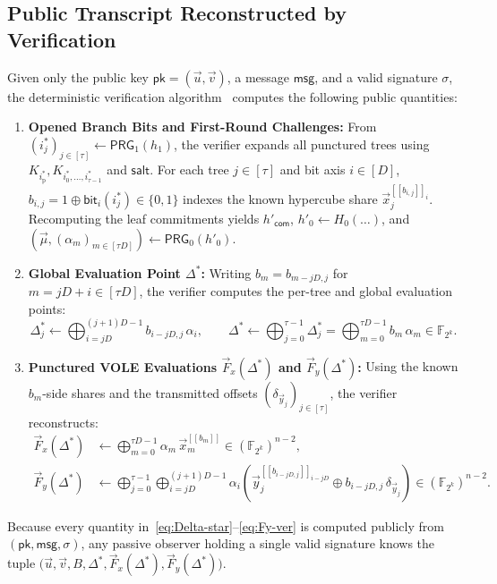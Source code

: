 \documentclass[11pt,a4paper]{article}
\theoremstyle{definition}
\theoremstyle{remark}
\newcommand{\Ftwok}{\mathbb{F}_{2^k}}
\newcommand{\pk}{\mathsf{pk}}
\newcommand{\salt}{\mathsf{salt}}
\newcommand{\msg}{\mathsf{msg}}
\newcommand{\com}{\mathsf{com}}
\newcommand{\PRG}{\mathsf{PRG}}
\newcommand{\share}[1]{[\![#1]\!]}
\begin{document}
\subsection{Public Transcript Reconstructed by Verification}
\label{subsec:verifier-reconstructs}
Given only the public key $\pk = (\vec{u}, \vec{v})$, a message $\msg$, and a valid signature $\sigma$, the deterministic verification algorithm~\cite[Section~5]{HJ25} computes the following public quantities:
\begin{enumerate}[leftmargin=2em]
    \item \textbf{Opened Branch Bits and First-Round Challenges:} From $(i^*_j)_{j \in [\tau]} \leftarrow \PRG_1(h_1)$, the verifier expands all punctured trees using $K_{i^*_{\text{p}}}, K_{i^*_0, \dots, i^*_{\tau-1}}$ and $\salt$. For each tree $j \in [\tau]$ and bit axis $i \in [D]$, $b_{i,j} = 1 \oplus \mathsf{bit}_i(i^*_j) \in \{0, 1\}$ indexes the known hypercube share $\vec{x}_j^{\share{b_{i,j}}_i}$. Recomputing the leaf commitments yields $h'_{\com}$, $h'_0 \leftarrow H_0(\dots)$, and $(\vec{\mu}, (\alpha_m)_{m \in [\tau D]}) \leftarrow \PRG_0(h'_0)$.
    \item \textbf{Global Evaluation Point $\Delta^*$:} Writing $b_m = b_{m - jD, j}$ for $m = jD + i \in [\tau D]$, the verifier computes the per-tree and global evaluation points:
    \begin{equation}
    \label{eq:Delta-star}
    \Delta^*_j \leftarrow \bigoplus_{i=jD}^{(j+1)D-1} b_{i-jD, j} \, \alpha_i, \qquad
    \Delta^* \leftarrow \bigoplus_{j=0}^{\tau-1} \Delta^*_j = \bigoplus_{m=0}^{\tau D-1} b_m \, \alpha_m \in \Ftwok.
    \end{equation}
    \item \textbf{Punctured VOLE Evaluations $\vec{F}_x(\Delta^*)$ and $\vec{F}_y(\Delta^*)$:} Using the known $b_m$-side shares and the transmitted offsets $(\delta_{\vec{y}_j})_{j \in [\tau]}$, the verifier reconstructs:
    \begin{align}
    \vec{F}_x(\Delta^*) &\leftarrow \bigoplus_{m=0}^{\tau D-1} \alpha_m \, \vec{x}_m^{\share{b_m}} \in (\Ftwok)^{n-2}, \label{eq:Fx-ver} \\
    \vec{F}_y(\Delta^*) &\leftarrow \bigoplus_{j=0}^{\tau-1} \bigoplus_{i=jD}^{(j+1)D-1} \alpha_i \left(\vec{y}_j^{\share{b_{i-jD,j}}_{i-jD}} \oplus b_{i-jD,j} \, \delta_{\vec{y}_j}\right) \in (\Ftwok)^{n-2}. \label{eq:Fy-ver}
    \end{align}
\end{enumerate}

Because every quantity in~\eqref{eq:Delta-star}--\eqref{eq:Fy-ver} is computed publicly from $(\pk, \msg, \sigma)$, any passive observer holding a single valid signature knows the tuple $\big(\vec{u}, \vec{v}, B, \Delta^*, \vec{F}_x(\Delta^*), \vec{F}_y(\Delta^*)\big)$.
\end{document}
